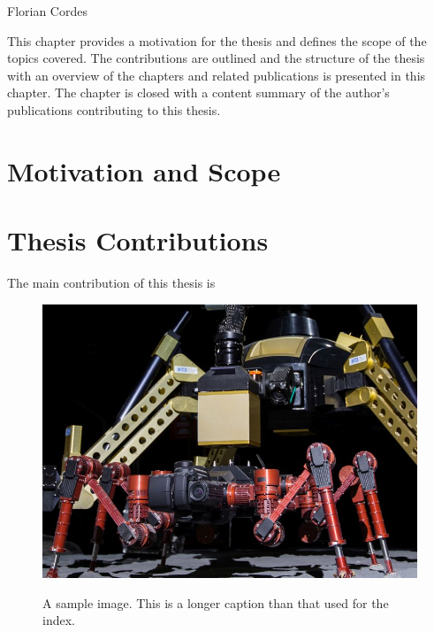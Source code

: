 
       {Florian Cordes}

This chapter provides a motivation for the thesis and defines the scope of the topics covered.
The contributions are outlined and the structure of the thesis with an overview of the chapters and related publications is presented in this chapter.
The chapter is closed with a content summary of the author's publications contributing to this thesis.


\section{Motivation and Scope}
\label{sec:Intoduction:Motivation}
\lipsum

\section{Thesis Contributions}
The main contribution of this thesis is

\begin{figure}%
  \centering
  \hypersetup{linkcolor=captionTextColor}
  \includegraphics[width=0.8\linewidth]{pictures/RIMRES-final-14}\\
  \caption[A sample image]
          {A sample image. This is a longer caption than that used for the index.}
  \label{fig:RIMRES-final-14}
\end{figure}

